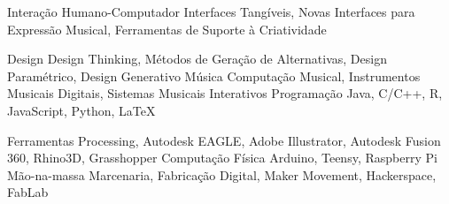 

\begin{cvskills}
  \cvskill
    {Interação Humano-Computador} %
    {Interfaces Tangíveis, Novas Interfaces para Expressão Musical, Ferramentas de Suporte à Criatividade} %

  \cvskill
    {Design} %
    {Design Thinking, Métodos de Geração de Alternativas, Design Paramétrico, Design Generativo} %
  \cvskill
    {Música} %
    {Computação Musical, Instrumentos Musicais Digitais, Sistemas Musicais Interativos} %
  \cvskill
    {Programação} %
    {Java, C/C++, R, JavaScript, Python, LaTeX} %

  \cvskill
    {Ferramentas} %
    {Processing, Autodesk EAGLE, Adobe Illustrator, Autodesk Fusion 360, Rhino3D, Grasshopper} %
  \cvskill
    {Computação Física} %
    {Arduino, Teensy, Raspberry Pi} %
  \cvskill
    {Mão-na-massa} %
    {Marcenaria, Fabricação Digital, Maker Movement, Hackerspace, FabLab} %

\end{cvskills}
